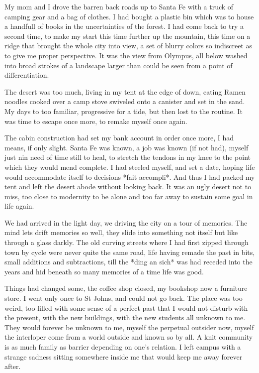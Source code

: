 \documentclass[ebook, 10pt, openright, onecolumn]{memoir}
\begin{document}
My mom and I drove the barren back roads up to Santa Fe with a truck of camping
gear and a bag of clothes.  I had bought a plastic bin which was to house a
handfull of books in the uncertainties of the forest.  I had come back to try a
second time, to make my start this time further up the mountain, this time on a
ridge that brought the whole city into view, a set of blurry colors so
indiscreet as to give me proper perspective.  It was the view from Olympus, all
below washed into broad strokes of a landscape larger than could be seen from a
point of differentiation.  

The desert was too much, living in my tent at the edge of down, eating Ramen
noodles cooked over a camp stove swiveled onto a canister and set in the sand.
My days to too familiar, progressive for a tide, but then lost to the routine.
It was time to escape once more, to remake myself once again.

The cabin construction had set my bank account in order once more, I had means,
if only slight.  Santa Fe was known, a job was known (if not had), myself just
nin need of time still to heal, to stretch the tendons in my knee to the point
which they would mend complete. I had steeled myself, and set a date, hoping
life would accommodate itself to decisions *fait accompli*.  And thus I had
packed my tent and left the desert abode without looking back.  It was an ugly
desert not to miss, too close to modernity to be alone and too far away to
sustain some goal in life again.

We had arrived in the light day, we driving the city on a tour of memories.  The
mind lets drift memories so well, they slide into something not itself but like
through a glass darkly.  The old curving streets where I had first zipped
through town by cycle were never quite the same road, life having remade the
past in bits, small additions and subtractions, till the *ding an sich* was had
receded into the years and hid beneath so many memories of a time life was good.

Things had changed some, the coffee shop closed, my bookshop now a furniture
store. I went only once to St Johns, and could not go back.  The place was too
weird, too filled with some sense of a perfect past that I would not disturb
with the present, with the new buildings, with the new students all unknown to
me.  They would forever be unknown to me, myself the perpetual outsider now,
myself the interloper come from a world outside and known so by all.  A knit
community is as much family as barrier depending on one's relation.  I left
campus with a strange sadness sitting somewhere inside me that would keep me
away forever after.
\end{document}
